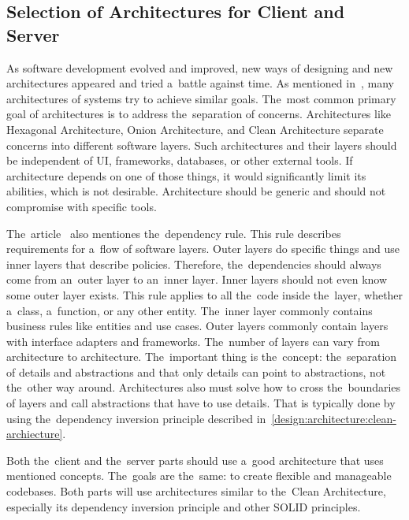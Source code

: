 \subsection{Selection of Architectures for Client and Server}

As software development evolved and improved, new ways of designing and new architectures appeared and tried a~battle against time.
As mentioned in~\cite{a2021_clean_architecture_blog}, many architectures of systems try to achieve similar goals.
The~most common primary goal of architectures is to address the~separation of concerns.
Architectures like Hexagonal Architecture, Onion Architecture, and Clean \mbox{Architecture} separate concerns into different software layers.
Such architectures and their layers should be independent of UI, frameworks, databases, or other external tools.
If architecture depends on one of those things, it would significantly limit its abilities, which is not desirable.
Architecture should be generic and should not compromise with specific tools.

The~article~\cite{a2021_clean_architecture_blog} also mentiones the~dependency rule.
This rule describes requirements for a~flow of software layers.
Outer layers do specific things and use inner layers that describe policies.
Therefore, the~dependencies should always come from an~outer layer to an~inner layer.
Inner layers should not even know some outer layer exists.
This rule applies to all the~code inside the~layer, whether a~class, a~function, or any other entity.
The~inner layer commonly contains business rules like entities and use cases.
Outer layers commonly contain layers with interface adapters and frameworks.
The~number of layers can vary from architecture to architecture.
The~important thing is the~concept: the~separation of details and abstractions and that only details can point to abstractions, not the~other way around.
Architectures also must solve how to cross the~boundaries of layers and call abstractions that have to use details.
That is typically done by using the~dependency inversion principle described in~\ref{design:architecture:clean-archiecture}.

Both the~client and the~server parts should use a~good architecture that uses mentioned concepts.
The~goals are the~same: to create flexible and manageable codebases.
Both parts will use architectures similar to the~Clean Architecture, especially its dependency inversion principle and other SOLID principles.


